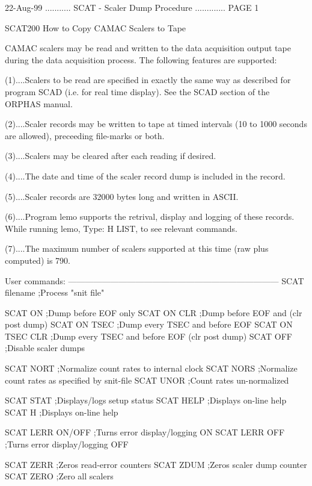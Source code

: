    22-Aug-99 ........... SCAT  -  Scaler Dump Procedure ............. PAGE   1
 
 
 
   SCAT200  How to Copy CAMAC Scalers to Tape
 
   CAMAC  scalers  may be read and written to the data acquisition output tape
   during the data acquisition process. The following features are supported:
 
   (1)....Scalers to be  read  are  specified  in  exactly  the  same  way  as
          described  for  program  SCAD  (i.e. for real time display). See the
          SCAD section of the ORPHAS manual.
 
   (2)....Scaler records may be written to tape  at  timed  intervals  (10  to
          1000 seconds are allowed), preceeding file-marks or both.
 
   (3)....Scalers may be cleared after each reading if desired.
 
   (4)....The  date  and  time  of  the  scaler record dump is included in the
          record.
 
   (5)....Scaler records are 32000 bytes long and written in ASCII.
 
   (6)....Program lemo supports the retrival, display  and  logging  of  these
          records. While running lemo, Type: H LIST, to see relevant commands.
 
 
   (7)....The  maximum  number  of  scalers  supported  at this time (raw plus
          computed) is 790.
 
   User commands:
   ---------------------------------------------------------------------------
   SCAT  filename         ;Process "snit file"
 
   SCAT  ON               ;Dump before EOF only
   SCAT  ON  CLR          ;Dump before EOF and (clr post dump)
   SCAT  ON  TSEC         ;Dump every TSEC and before EOF
   SCAT  ON  TSEC  CLR    ;Dump every TSEC and before EOF (clr post dump)
   SCAT  OFF              ;Disable scaler dumps
 
   SCAT  NORT             ;Normalize count rates to internal clock
   SCAT  NORS             ;Normalize count rates as specified by snit-file
   SCAT  UNOR             ;Count rates un-normalized
 
   SCAT  STAT             ;Displays/logs setup status
   SCAT  HELP             ;Displays on-line help
   SCAT  H                ;Displays on-line help
 
   SCAT  LERR ON/OFF      ;Turns error display/logging ON
   SCAT  LERR OFF         ;Turns error display/logging OFF
 
   SCAT  ZERR             ;Zeros read-error  counters
   SCAT  ZDUM             ;Zeros scaler dump counter
   SCAT  ZERO             ;Zero all scalers
 
